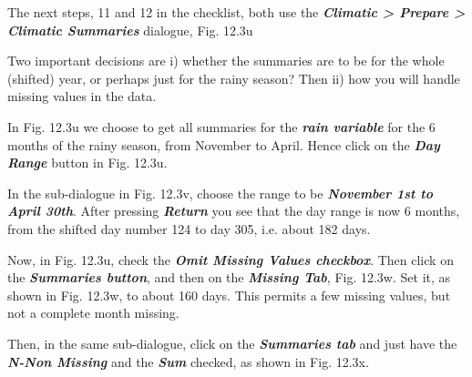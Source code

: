 \documentclass[
  letterpaper,
  DIV=11,
  numbers=noendperiod]{scrreprt}
\begin{document}
The next steps, 11 and 12 in the checklist, both use the
\textbf{\emph{Climatic \textgreater{} Prepare \textgreater{} Climatic
Summaries}} dialogue, Fig. 12.3u

Two important decisions are i) whether the summaries are to be for the
whole (shifted) year, or perhaps just for the rainy season? Then ii) how
you will handle missing values in the data.

In Fig. 12.3u we choose to get all summaries for the \textbf{\emph{rain
variable}} for the 6 months of the rainy season, from November to April.
Hence click on the \textbf{\emph{Day Range}} button in Fig. 12.3u.

In the sub-dialogue in Fig. 12.3v, choose the range to be
\textbf{\emph{November 1st to April 30th}}. After pressing
\textbf{\emph{Return}} you see that the day range is now 6 months, from
the shifted day number 124 to day 305, i.e. about 182 days.

Now, in Fig. 12.3u, check the \textbf{\emph{Omit Missing Values
checkbox}}. Then click on the \textbf{\emph{Summaries button}}, and then
on the \textbf{\emph{Missing Tab}}, Fig. 12.3w. Set it, as shown in Fig.
12.3w, to about 160 days. This permits a few missing values, but not a
complete month missing.

Then, in the same sub-dialogue, click on the \textbf{\emph{Summaries
tab}} and just have the \textbf{\emph{N-Non Missing}} and the
\textbf{\emph{Sum}} checked, as shown in Fig. 12.3x.
\end{document}
